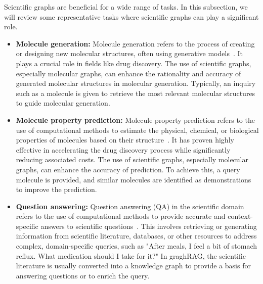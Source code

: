 Scientific graphs are beneficial for a wide range of tasks. In this subsection, we will review some representative tasks where scientific graphs can play a significant role. 

\begin{itemize}[leftmargin=*]
\item \textbf{Molecule generation:} Molecule generation refers to the process of creating or designing new molecular structures, often using generative models~\cite{wangretrieval,huanginteraction}. It plays a crucial role in fields like drug discovery. The use of scientific graphs, especially molecular graphs, can enhance the rationality and accuracy of generated molecular structures in molecular generation. Typically, an inquiry such as a molecule is given to retrieve the most relevant molecular structures to guide molecular generation. 

\item \textbf{Molecule property prediction:} Molecule property prediction refers to the use of computational methods to estimate the physical, chemical, or biological properties of molecules based on their structure~\cite{liu2024moleculargpt}. 
It has proven highly effective in accelerating the drug discovery process while significantly reducing associated costs. The use of scientific graphs, especially molecular graphs, can enhance the accuracy of prediction. To achieve this, a query molecule is provided, and similar molecules are identified as demonstrations to improve the prediction.

\item \textbf{Question answering:} Question answering (QA) in the scientific domain refers to the use of computational methods to provide accurate and context-specific answers to scientific questions~\cite{yang2024kg, jiang2024hykge, wen2023mindmap, li2024dalk, jeong2024improving,wu2024medical,soman2024biomedical}. This involves retrieving or generating information from scientific literature, databases, or other resources to address complex, domain-specific queries, such as "After meals, I feel a bit of stomach reflux. What medication should I take for it?" In graghRAG, the scientific literature is usually converted into a knowledge graph to provide a basis for answering questions or to enrich the query.
\end{itemize}


